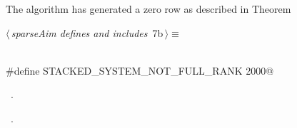 \documentclass{article}
\begin{document}
\begin{description}
\begin{description}
\begin{flushleft}
\begin{minipage}{\linewidth}
\begin{list}{}{\setlength{\itemsep}{-\parsep}\setlength{\itemindent}{-\leftmargin}}
\item{}
\end{list}
\end{minipage}\vspace{4ex}
\end{flushleft}
\item[{\bf STACKED\_SYSTEM\_NOT\_FULL\_RANK}] The algorithm has generated a zero 
row as described in Theorem
\begin{flushleft} \small
\begin{minipage}{\linewidth}\label{scrap3}\raggedright\small
{} $\langle\,${\itshape sparseAim defines and includes}\nobreak\ {\footnotesize {7b}}$\,\rangle\equiv$
\vspace{-1ex}
\begin{list}{}{} \item
\mbox{}\verb@@\\
\mbox{}\verb@#define STACKED_SYSTEM_NOT_FULL_RANK 2000@\\
\mbox{}\verb@@{\NWsep}
\end{list}
\vspace{-1.5ex}
\footnotesize
\begin{list}{}{\setlength{\itemsep}{-\parsep}\setlength{\itemindent}{-\leftmargin}}
\item \NWtxtMacroDefBy\ .
\item \NWtxtMacroRefIn\ .


\end{list}
\end{minipage}
\end{flushleft}
\end{description}
\end{description}
\end{document}
